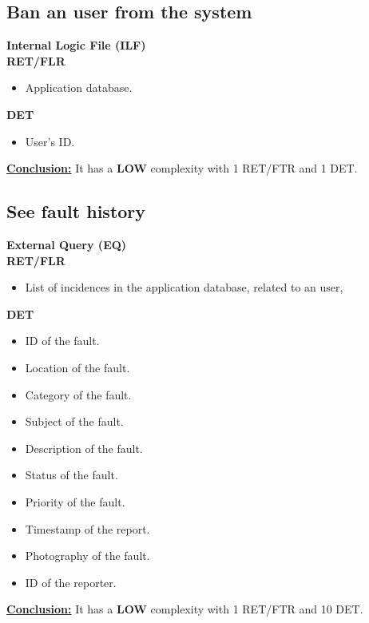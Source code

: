 \subsection{Ban an user from the system}
\textbf{Internal Logic File (ILF)} \\ 
\textbf{RET/FLR}
\begin{itemize}
\item Application database.
\end{itemize}
\textbf{DET}
\begin{itemize}
\item User's ID.
\end{itemize}
\textbf{\underline{Conclusion:}} It has a \textbf{LOW} complexity with 1 RET/FTR and 1 DET.

\subsection{See fault history}
\textbf{External Query (EQ)} \\ 
\textbf{RET/FLR}
\begin{itemize}
\item List of incidences in the application database, related to an user,
\end{itemize}
\textbf{DET}
\begin{itemize}
\item ID of the fault.
\item Location of the fault.
\item Category of the fault.
\item Subject of the fault.
\item Description of the fault.
\item Status of the fault.
\item Priority of the fault.
\item Timestamp of the report.
\item Photography of the fault.
\item ID of the reporter.
\end{itemize}
\textbf{\underline{Conclusion:}} It has a \textbf{LOW} complexity with 1 RET/FTR and 10 DET.

